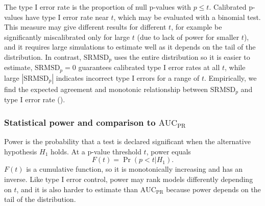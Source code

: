 \documentclass[9pt,lineno]{elife}
\newcommand{\rmsd}{\text{SRMSD}_p}
\newcommand{\auc}{\text{AUC}_\text{PR}}
\begin{document}
\begin{appendixbox}
  The type I error rate is the proportion of null p-values with $p \le t$.
  Calibrated p-values have type I error rate near $t$, which may be evaluated with a binomial test.
  This measure may give different results for different $t$, for example be significantly miscalibrated only for large $t$ (due to lack of power for smaller $t$), and it requires large simulations to estimate well as it depends on the tail of the distribution.
  In contrast, $\rmsd$ uses the entire distribution so it is easier to estimate, $\rmsd = 0$ guarantees calibrated type I error rates at all $t$, while large $|\rmsd|$ indicates incorrect type I errors for a range of $t$.
  Empirically, we find the expected agreement and monotonic relationship between $\rmsd$ and type I error rate ().

  \subsubsection{Statistical power and comparison to $\auc$}

  Power is the probability that a test is declared significant when the alternative hypothesis $H_1$ holds.
  At a p-value threshold $t$, power equals
    $$
    F(t) = \Pr( p < t | H_1 ).
    $$
  $F(t)$ is a cumulative function, so it is monotonically increasing and has an inverse.
  Like type I error control, power may rank models differently depending on $t$, and it is also harder to estimate than $\auc$ because power depends on the tail of the distribution.


\end{appendixbox}
\end{document}
